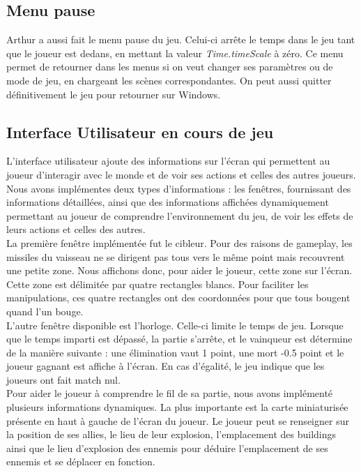 \documentclass[12pt, titlepage]{article}
\begin{document}
\begin{spacing}{1.5}
\subsection{Menu pause}

Arthur a aussi fait le menu pause du jeu. Celui-ci arrête le temps dans le jeu tant que le joueur est dedans, en mettant la valeur \textit{Time.timeScale} à zéro. Ce menu permet de retourner dans les menus si on veut changer ses paramètres ou de mode de jeu, en chargeant les scènes correspondantes. On peut aussi quitter définitivement le jeu pour retourner sur Windows.

\subsection{Interface Utilisateur en cours de jeu}

L'interface utilisateur ajoute des informations sur l'écran qui permettent au joueur d'interagir avec le monde et de voir ses actions et celles des autres joueurs. Nous avons implémentes deux types d'informations : les fenêtres, fournissant des informations détaillées, ainsi que des informations affichées dynamiquement permettant au joueur de comprendre l'environnement du jeu, de voir les effets de leurs actions et celles des autres.\\

La première fenêtre implémentée fut le cibleur. Pour des raisons de gameplay, les missiles du vaisseau ne se dirigent pas tous vers le même point mais recouvrent une petite zone. Nous affichons donc, pour aider le joueur, cette zone sur l'écran. Cette zone est délimitée par quatre rectangles blancs. Pour faciliter les manipulations, ces quatre rectangles ont des coordonnées pour que tous bougent quand l'un bouge.\\

L'autre fenêtre disponible est l'horloge.  Celle-ci limite le temps de jeu. Lorsque que le temps imparti est dépassé, la partie s'arrête, et le vainqueur est détermine de la manière suivante : une élimination vaut 1 point, une mort -0.5 point et le joueur gagnant est affiche à l'écran. En cas d'égalité, le jeu indique que les joueurs ont fait match nul. \\

Pour aider le joueur à comprendre le fil de sa partie, nous avons implémenté plusieurs informations dynamiques. La plus importante est la carte miniaturisée présente en haut à gauche de l'écran du joueur. Le joueur peut se renseigner sur la position de ses allies, le lieu de leur explosion, l'emplacement des buildings ainsi que le lieu d'explosion des ennemis pour déduire l'emplacement de ses ennemis et se déplacer en fonction.\\


\end{spacing}
\end{document}
